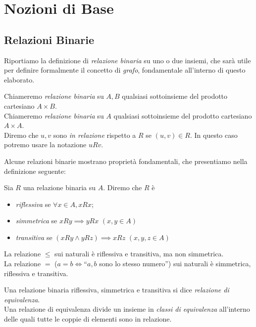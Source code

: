 \section{Nozioni di Base}

\subsection{Relazioni Binarie}
Riportiamo la definizione di \emph{relazione binaria} su uno o due insiemi, che sarà utile per definire formalmente il concetto di \emph{grafo}, fondamentale all'interno di questo elaborato.
\begin{definition}
    Chiameremo \emph{relazione binaria} su $A,B$ qualsiasi sottoinsieme del prodotto cartesiano $A \times B$.\\
    Chiameremo \emph{relazione binaria} su $A$ qualsiasi sottoinsieme del prodotto cartesiano $A \times A$.\\
	Diremo che $u,v$ sono \emph{in relazione} rispetto a $R$ se $(u,v) \in R$. In questo caso potremo usare la notazione $u R v$.
\end{definition}
Alcune relazioni binarie mostrano proprietà fondamentali, che presentiamo nella definizione seguente:
\begin{definition}
    Sia $R$ una relazione binaria su $A$. Diremo che $R$ è
    \begin{itemize}
        \item \emph{riflessiva} se $\forall x \in A, x R x$;
        \item \emph{simmetrica} se $x R y \implies y R x \,\,(x,y \in A)$
        \item \emph{transitiva} se $(x R y \land y R z) \implies x R z \,\,(x,y,z \in A)$
    \end{itemize}
\end{definition}
\begin{example}
    La relazione $\leq$ sui naturali è riflessiva e transitiva, ma non simmetrica.\\
    La relazione $=$ ($a = b \iff $``$a,b$ sono lo stesso numero'') sui naturali è simmetrica, riflessiva e transitiva.
\end{example}
\begin{definition}
    Una relazione binaria riflessiva, simmetrica e transitiva si dice \emph{relazione di equivalenza}.\\
    Una relazione di equivalenza divide un insieme in \emph{classi di equivalenza} all'interno delle quali tutte le coppie di elementi sono in relazione.
\end{definition}
